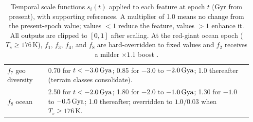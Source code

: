 \begin{table}[H]
\begin{tabular}{p{3.2cm}p{7.0cm}p{3.6cm}}
$f_7$ geo diversity &
  0.70 for $t < -3.0\,\text{Gya}$; 0.85 for $-3.0$ to $-2.0\,\text{Gya}$; 1.0 thereafter
  (terrain classes consolidate). & \citet{Lopes2019} \\[4pt]

$f_8$ ocean &
  2.50 for $t < -2.0\,\text{Gya}$; 1.80 for $-2.0$ to $-1.0\,\text{Gya}$;
  1.30 for $-1.0$ to $-0.5\,\text{Gya}$; 1.0 thereafter;
  overridden to $1.0/0.03$ when $T_s \geq 176\,\mathrm{K}$. &
  \citet{Iess2012,Nimmo2010,Tobie2005} \\
\bottomrule
\end{tabular}
\caption{Temporal scale functions $s_i(t)$ applied to each feature at epoch $t$
  (Gyr from present), with supporting references.  A multiplier of 1.0 means
  no change from the present-epoch value; values $< 1$ reduce the feature,
  values $> 1$ enhance it.  All outputs are clipped to $[0, 1]$ after scaling.
  At the red-giant ocean epoch ($T_s \geq 176\,\mathrm{K}$), $f_1$, $f_3$, $f_4$,
  and $f_8$ are hard-overridden to fixed values and $f_2$ receives a milder
  $\times1.1$ boost \citep{Grasset2005,Tobie2005,Lorenz1997}.}
\label{tab:scale_funcs}
\end{table}

